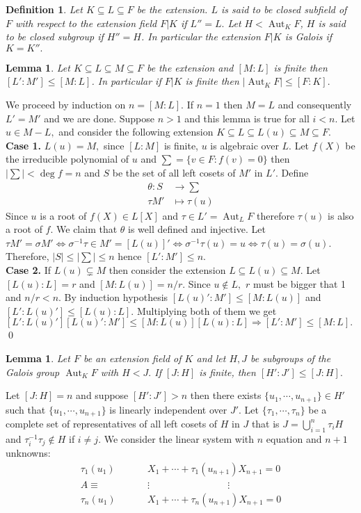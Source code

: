 \documentclass[11pt]{amsart}
\newtheorem{defn}[theorem]{Definition}
\newtheorem{lemma}[theorem]{Lemma}%
\DeclareMathOperator{\aut}{\text{Aut}}
\begin{document}
\begin{defn}
Let $K\subseteq L\subseteq F$ be the extension. $L$ is said to be closed subfield of $F$ with respect to the extension field $F|K$ if $L''=L.$ Let $H<\aut_KF$, $H$ is said to be closed subgroup if $H''=H$. In particular the extension $F|K$ is Galois if $K=K''.$
\end{defn}
\begin{lemma}
Let $K\subseteq L\subseteq M\subseteq F$ be the extension and $[M:L]$ is finite then $[L':M']\leq [M:L]$. In particular if $F|K$ is finite then $|\aut_KF|\leq [F:K].$
\end{lemma}
\proof We proceed by induction on $n=[M:L].$ If $n=1$ then $M=L$ and consequently $L'=M'$ and we are done. Suppose $n>1$ and this lemma is true for all $i<n.$ Let $u\in M-L,$ and consider the following extension $K\subseteq L\subseteq L(u)\subseteq M\subseteq F.$\\
\textbf{Case 1.} $L(u)=M,$ since $[L:M]$ is finite, $u$ is algebraic over $L$. Let $f(X)$ be the irreducible polynomial of $u$ and $\sum=\{v\in F:f(v)=0\}$ then $|\sum|<\deg f=n$ and $S$ be the set of all left cosets of $M'$ in $L'$. Define \begin{align*}
\theta:S&\to \sum\\
\tau M'&\mapsto \tau(u)
\end{align*}
Since $u$ is a root of $f(X)\in L[X]$ and $\tau\in L'=\aut_LF$ therefore $\tau(u)$ is also a root of $f$. We claim that $\theta$ is well defined and injective. Let $\tau M'=\sigma M' \Leftrightarrow \sigma^{-1}\tau\in M'=[L(u)]' \Leftrightarrow \sigma^{-1}\tau(u)=u \Leftrightarrow \tau(u)=\sigma(u)$. Therefore, $|S|\leq |\sum|\leq n$ hence $[L':M']\leq n.$\\
\textbf{Case 2.} If $L(u)\subsetneq M$ then consider the extension $L\subseteq L(u)\subseteq M.$ Let $[L(u):L]=r$ and $[M:L(u)]=n/r.$ Since $u\notin L,$ $r$ must be bigger that 1 and $n/r<n.$ By induction hypothesis $[L(u)':M']\leq [M:L(u)]$ and $[L':L(u)']\leq [L(u):L].$ Multiplying both of them we get $[L':L(u)'][L(u)':M']\leq [M:L(u)][L(u):L] \Rightarrow [L':M']\leq [M:L].$ \qed
\begin{lemma}
Let $F$ be an extension field of $K$ and let $H, J$ be subgroups of the Galois group $\aut_KF$ with $H<J.$ If $[J:H]$ is finite, then $[H':J']\leq [J:H].$
\end{lemma}
\proof Let $[J:H]=n$ and suppose $[H':J']>n$ then there exists $\{u_1,\cdots,u_{n+1}\}\in H'$ such that $\{u_1,\cdots,u_{n+1}\}$ is linearly independent over $J'.$ Let $\{\tau_1,\cdots,\tau_n\}$ be a complete set of representatives of all left cosets of $H$ in $J$ that is $J=\displaystyle\bigcup_{i=1}^n \tau_i H$ and $\tau_i^{-1}\tau_j\notin H$ if $i\neq j.$ We consider the linear system with $n$ equation and $n+1$ unknowns:\begin{align*}
\tau_1(u_1)&X_1+\cdots+\tau_1(u_{n+1})X_{n+1}=0\\
A\equiv\qquad\qquad&\vdots \qquad\qquad\qquad\qquad \vdots\\
\tau_n(u_1)&X_1+\cdots+\tau_n(u_{n+1})X_{n+1}=0
\end{align*}
\end{document}
